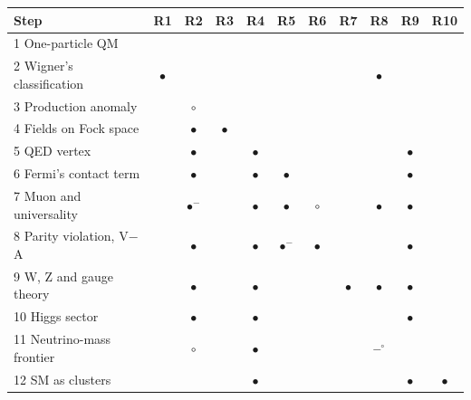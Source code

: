 \begin{tabular}{@{}lcccccccccc@{}}\toprule
Step & R1 & R2 & R3 & R4 & R5 & R6 & R7 & R8 & R9 & R10 \\\midrule
1 One-particle QM &  &  &  &  &  &  &  &  &  &  \\
2 Wigner's classification & $\bullet$ &  &  &  &  &  &  & $\bullet$ &  &  \\
3 Production anomaly &  & $\circ$ &  &  &  &  &  &  &  &  \\
4 Fields on Fock space &  & $\bullet$ & $\bullet$ &  &  &  &  &  &  &  \\
5 QED vertex &  & $\bullet$ &  & $\bullet$ &  &  &  &  & $\bullet$ &  \\
6 Fermi's contact term &  & $\bullet$ &  & $\bullet$ & $\bullet$ &  &  &  & $\bullet$ &  \\
7 Muon and universality &  & \textbf{$\bullet$}$^{-}$ &  & $\bullet$ & $\bullet$ & $\circ$ &  & $\bullet$ & $\bullet$ &  \\
8 Parity violation, V$-$A &  & $\bullet$ &  & $\bullet$ & \textbf{$\bullet$}$^{-}$ & $\bullet$ &  &  & $\bullet$ &  \\
9 W, Z and gauge theory &  & $\bullet$ &  & $\bullet$ &  &  & $\bullet$ & $\bullet$ & $\bullet$ &  \\
10 Higgs sector &  & $\bullet$ &  & $\bullet$ &  &  &  &  & $\bullet$ &  \\
11 Neutrino-mass frontier &  & $\circ$ &  & $\bullet$ &  &  &  & \textbf{--}$^{\circ}$ &  &  \\
12 SM as clusters &  &  &  & $\bullet$ &  &  &  &  & $\bullet$ & $\bullet$ \\
\bottomrule\end{tabular}
